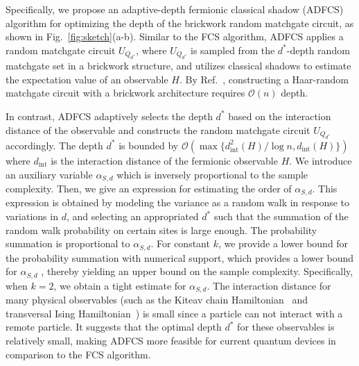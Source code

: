 \documentclass[journal=jctcce,a4paper,manuscript=article]{achemso}
\newcommand{\cbra}[1]{\{ #1 \}}
\newcommand{\Ord}[1]{\mathcal{O}\left( #1 \right)}
\begin{document}
Specifically, we propose an adaptive-depth fermionic classical shadow (ADFCS)
algorithm for optimizing the depth of the brickwork random matchgate circuit,
as shown in Fig.~\ref{fig:sketch}(a-b). Similar to the FCS algorithm, ADFCS
applies a random matchgate circuit $U_{Q_{d^\ast}}$, where $U_{Q_{d^\ast}}$ is
sampled from the $d^\ast$-depth random matchgate set in a brickwork structure,
and utilizes classical shadows to estimate the expectation value of an
observable $H$. By Ref.~\cite{Jiang18Quantum}, constructing a Haar-random
matchgate circuit with a brickwork architecture requires $\mathcal{O}(n)$
depth.

In contrast, ADFCS adaptively selects the depth $d^\ast$ based on the
interaction distance of the observable and constructs the random matchgate
circuit $U_{Q_{d^\ast}}$ accordingly. The depth $d^\ast$ is {bounded by}
$\Ord{\max\cbra{d^2_{\text{int}}(H)/\log n, d_{\text{int}}(H)}}$ where
$d_{\text{int}}$ is the interaction distance of the fermionic observable $H$.
We introduce an auxiliary variable $\alpha_{S,d}$ which is inversely
proportional to the sample complexity. Then, we give an expression for
estimating the order of $\alpha_{S,d}$. This expression is obtained by modeling
the variance as a random walk in response to variations in $d$, and selecting
an appropriated $d^\ast$ such that the summation of the random walk probability
on certain sites is large enough. The probability summation is proportional to
$\alpha_{S,d}$.
For constant \( k \), we provide a lower bound for the probability summation
with numerical support, which provides a lower bound for $\alpha_{S,d}$ ,
thereby yielding an upper bound on the sample complexity. Specifically, when \(
k = 2 \), we obtain a tight estimate for \( \alpha_{S,d} \). The interaction
distance for many physical observables (such as the Kiteav chain
Hamiltonian~\cite{greiter20141d, borla2021gauging} and transversal Ising
Hamiltonian~\cite{greiter20141d, marsolais2021equivalence}) is small since a
particle can not interact with a remote particle. It suggests that the optimal
depth $d^\ast$ for these observables is relatively small, making ADFCS more
feasible for current quantum devices in comparison to the FCS algorithm.

\end{document}
